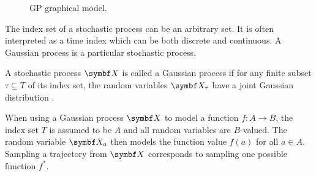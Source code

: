 \begin{figure}[t]
    \centering
    \caption{
        GP graphical model.
        \label{fig:gp:graphical_model}
    }
\end{figure}
The index set of a stochastic process can be an arbitrary set.
It is often interpreted as a time index which can be both discrete and continuous.
A Gaussian process is a particular stochastic process.
\begin{definition}
    \label{def:gp:gaussian_process}
    A stochastic process $\rv{X}$ is called a Gaussian process if for any finite subset $\tau \subseteq T$ of its index set, the random variables $\rv{X}_\tau$ have a joint Gaussian distribution \cite{astrom_introduction_1971}.
\end{definition}
When using a Gaussian process $\rv{X}$ to model a function $f \colon A \to B$, the index set $T$ is assumed to be $A$ and all random variables are $B$-valued.
The random variable $\rv{X}_a$ then models the function value $f(a)$ for all $a \in A$.
Sampling a trajectory from $\rv{X}$ corresponds to sampling one possible function $f^\ast$.

